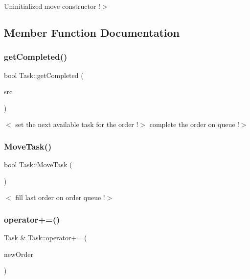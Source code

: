 Uninitialized move constructor !$>$ 

\subsection{Member Function Documentation}
\mbox{\label{class_task_a6cfa898328059215d5a89f27aac7985b}} 
\subsubsection{\texorpdfstring{get\+Completed()}{getCompleted()}}
{\footnotesize\ttfamily bool Task\+::get\+Completed (\begin{DoxyParamCaption}\item[{\mbox{\hyperlink{class_customer_order}{Customer\+Order}} \&}]{src }\end{DoxyParamCaption})}

$<$ set the next available task for the order !$>$ complete the order on queue !$>$ \mbox{\label{class_task_ad5f00535195117634b86714e628abd77}} 
\subsubsection{\texorpdfstring{Move\+Task()}{MoveTask()}}
{\footnotesize\ttfamily bool Task\+::\+Move\+Task (\begin{DoxyParamCaption}{ }\end{DoxyParamCaption})}

$<$ fill last order on order queue !$>$ \mbox{\label{class_task_a3ed2681da2f886dc5742dc180f03a3b8}} 
\subsubsection{\texorpdfstring{operator+=()}{operator+=()}}
{\footnotesize\ttfamily \mbox{\hyperlink{class_task}{Task}} \& Task\+::operator+= (\begin{DoxyParamCaption}\item[{\mbox{\hyperlink{class_customer_order}{Customer\+Order}} \&\&}]{new\+Order }\end{DoxyParamCaption})}

